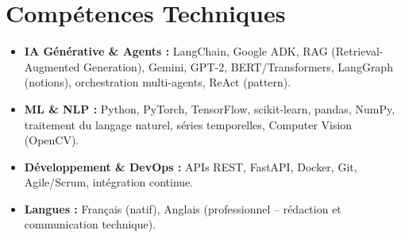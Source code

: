 \documentclass[a4paper,11pt]{article}
\begin{document}
\section{Compétences Techniques}
\begin{itemize}[leftmargin=*, nosep]
    \item \small{\textbf{IA Générative \& Agents :} LangChain, Google ADK, RAG (Retrieval-Augmented Generation), Gemini, GPT-2, BERT/Transformers, LangGraph (notions), orchestration multi-agents, ReAct (pattern).}
    \item \small{\textbf{ML \& NLP :} Python, PyTorch, TensorFlow, scikit-learn, pandas, NumPy, traitement du langage naturel, séries temporelles, Computer Vision (OpenCV).}
    \item \small{\textbf{Développement \& DevOps :} APIs REST, FastAPI, Docker, Git, Agile/Scrum, intégration continue.}
    \item \small{\textbf{Langues :} Français (natif), Anglais (professionnel -- rédaction et communication technique).}
\end{itemize}

\end{document}
